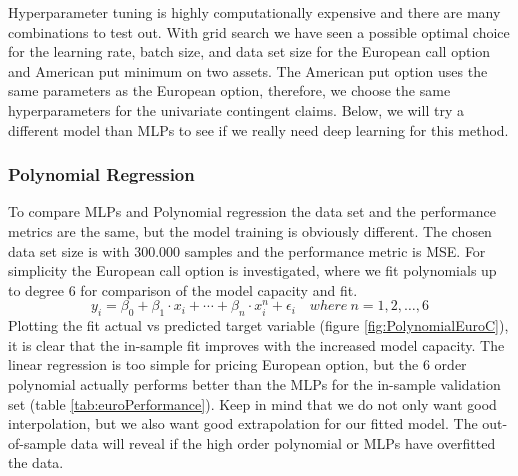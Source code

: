 Hyperparameter tuning is highly computationally expensive and there are many combinations to test out. With grid search we have seen a possible optimal choice for the learning rate, batch size, and data set size for the European call option and American put minimum on two assets. The American put option uses the same parameters as the European option, therefore,  we choose the same hyperparameters for the univariate contingent claims. Below, we will try a different model than MLPs to see if we really need deep learning for this method. 

\subsubsection{Polynomial Regression}
To compare MLPs and Polynomial regression the data set and the performance metrics are the same, but the model training is obviously different. The chosen data set size is with 300.000 samples and the performance metric is MSE. For simplicity the European call option is investigated, where we fit polynomials up to degree 6 for comparison of the model capacity and fit.  
$$y_i=\beta_0 + \beta_1 \cdot x_i + \cdots + \beta_n \cdot x_i^n + \epsilon_i \quad where \ n=1,2,\ldots,6$$
Plotting the fit actual vs predicted target variable (figure \ref{fig:PolynomialEuroC}), it is clear that the in-sample fit improves with the increased model capacity. The linear regression is too simple for pricing European option, but the 6 order polynomial actually performs better than the MLPs for the in-sample validation set (table \ref{tab:euroPerformance}). Keep in mind that we do not only want good interpolation, but we also want good extrapolation for our fitted model. The out-of-sample data will reveal if the high order polynomial or MLPs have overfitted the data.\\

